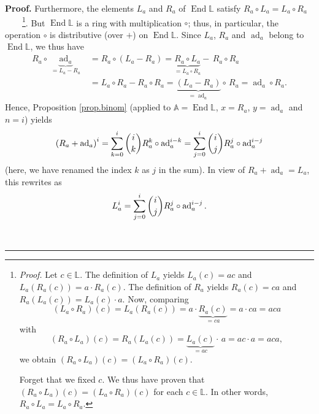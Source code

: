 \documentclass[numbers=enddot,12pt,final,onecolumn,notitlepage]{scrartcl}%
\theoremstyle{definition}
\newenvironment{proof}[1][Proof]{\noindent\textbf{#1.} }{\ \rule{0.5em}{0.5em}}
\let\sumnonlimits\sum
\renewcommand{\sum}{\sumnonlimits\limits}
\begin{document}
\begin{proof}
Furthermore, the elements $L_{a}$ and $R_{a}$ of $\operatorname*{End}%
\mathbb{L}$ satisfy $R_{a}\circ L_{a}=L_{a}\circ R_{a}$%
\ \ \ \ \footnote{\textit{Proof.} Let $c\in\mathbb{L}$. The definition of
$L_{a}$ yields $L_{a}\left(  c\right)  =ac$ and $L_{a}\left(  R_{a}\left(
c\right)  \right)  =a\cdot R_{a}\left(  c\right)  $. The definition of $R_{a}$
yields $R_{a}\left(  c\right)  =ca$ and $R_{a}\left(  L_{a}\left(  c\right)
\right)  =L_{a}\left(  c\right)  \cdot a$. Now, comparing%
\[
\left(  L_{a}\circ R_{a}\right)  \left(  c\right)  =L_{a}\left(  R_{a}\left(
c\right)  \right)  =a\cdot\underbrace{R_{a}\left(  c\right)  }_{=ca}=a\cdot
ca=aca
\]
with%
\[
\left(  R_{a}\circ L_{a}\right)  \left(  c\right)  =R_{a}\left(  L_{a}\left(
c\right)  \right)  =\underbrace{L_{a}\left(  c\right)  }_{=ac}\cdot\,
a=ac\cdot a=aca,
\]
we obtain $\left(  R_{a}\circ L_{a}\right)  \left(  c\right)  =\left(
L_{a}\circ R_{a}\right)  \left(  c\right)  $.
\par
Forget that we fixed $c$. We thus have proven that $\left(  R_{a}\circ
L_{a}\right)  \left(  c\right)  =\left(  L_{a}\circ R_{a}\right)  \left(
c\right)  $ for each $c\in\mathbb{L}$. In other words, $R_{a}\circ L_{a}%
=L_{a}\circ R_{a}$.}. But $\operatorname*{End}\mathbb{L}$ is a ring with
multiplication $\circ$; thus, in particular, the operation $\circ$ is
distributive (over $+$) on $\operatorname*{End}\mathbb{L}$. Since $L_{a}$,
$R_{a}$ and $\operatorname*{ad}\nolimits_{a}$ belong to $\operatorname*{End}%
\mathbb{L}$, we thus have%
\begin{align*}
R_{a}\circ\underbrace{\operatorname*{ad}\nolimits_{a}}_{=L_{a}-R_{a}}  &
=R_{a}\circ\left(  L_{a}-R_{a}\right)  =\underbrace{R_{a}\circ L_{a}}%
_{=L_{a}\circ R_{a}}-\,R_{a}\circ R_{a}\\
&  =L_{a}\circ R_{a}-R_{a}\circ R_{a}=\underbrace{\left(  L_{a}-R_{a}\right)
}_{=\operatorname*{ad}\nolimits_{a}}\circ\, R_{a}=\operatorname*{ad}%
\nolimits_{a}\circ R_{a}.
\end{align*}
Hence, Proposition \ref{prop.binom} (applied to $\mathbb{A}%
=\operatorname*{End}\mathbb{L}$, $x=R_{a}$, $y=\operatorname*{ad}%
\nolimits_{a}$ and $n=i$) yields%
\[
\left(  R_{a}+\operatorname*{ad}\nolimits_{a}\right)  ^{i}=\sum_{k=0}%
^{i}\dbinom{i}{k}R_{a}^{k}\circ\operatorname*{ad}\nolimits_{a}^{i-k}%
=\sum_{j=0}^{i}\dbinom{i}{j}R_{a}^{j}\circ\operatorname*{ad}\nolimits_{a}%
^{i-j}%
\]
(here, we have renamed the index $k$ as $j$ in the sum). In view of
$R_{a}+\operatorname*{ad}\nolimits_{a}=L_{a}$, this rewrites as%
\begin{equation}
L_{a}^{i}=\sum_{j=0}^{i}\dbinom{i}{j}R_{a}^{j}\circ\operatorname*{ad}%
\nolimits_{a}^{i-j}. \label{pf.lem.ada1.5}%
\end{equation}



\end{proof}
\end{document}
